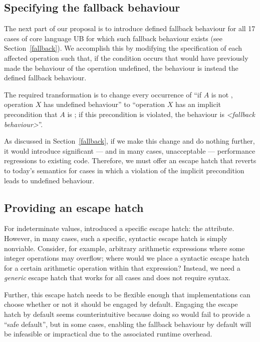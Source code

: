 \subsection{Specifying the fallback behaviour}
\label{specifyfallback}

The next part of our proposal is to introduce defined fallback behaviour for all 17 cases of core language UB for which such fallback behaviour exists (see Section~\ref{fallback}). We accomplish this by modifying the specification of each affected operation such that, if the condition occurs that would have previously made the behaviour of the operation undefined, the behaviour is instead the defined fallback behaviour.

The required transformation is to change every occurrence of “if $A$ is not , operation $X$ has undefined behaviour'' to ``operation $X$ has an implicit precondition that $A$ is ; if this precondition is violated, the behaviour is \emph{<fallback behaviour>}''.

As discussed in Section~\ref{fallback}, if we make this change and do nothing further, it would introduce significant --- and in many cases, unacceptable --- performance regressions to existing code. Therefore, we must offer an escape hatch that reverts to today's semantics for cases in which a violation of the implicit precondition leads to undefined behaviour.

\subsection{Providing an escape hatch}
\label{assume}

For indeterminate values, \cite{P2795R5} introduced a specific escape hatch: the \tcode{[[indeterminate]]} attribute. However, in many cases, such a specific, syntactic escape hatch is simply nonviable. Consider, for example, arbitrary arithmetic expressions where some integer operations may overflow; where would we place a syntactic escape hatch for a certain arithmetic operation within that expression? Instead, we need a \emph{generic} escape hatch that works for all cases and does not require syntax.

Further, this escape hatch needs to be flexible enough that implementations can choose whether or not it should be engaged by default. Engaging the escape hatch by default seems counterintuitive because doing so would fail to provide a ``safe default'', but in some cases, enabling the fallback behaviour by default will be infeasible or impractical due to the associated runtime overhead.

